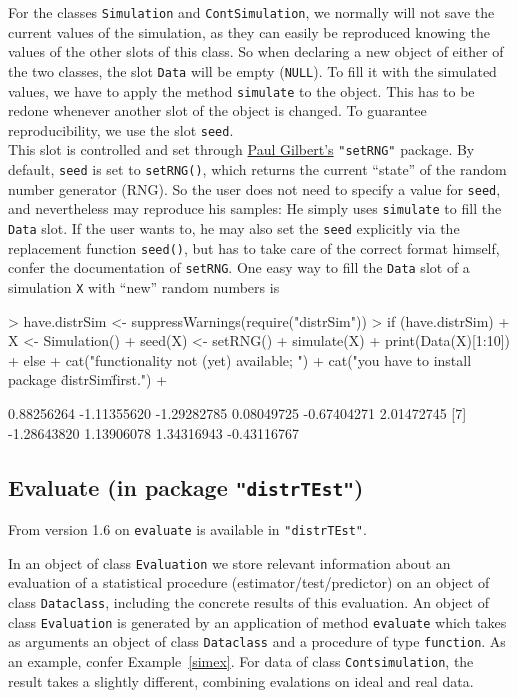 \documentclass[11pt]{article}
\newcommand{\code}[1]{{\tt #1}}
\newcommand{\pkg}[1]{{\tt "#1"}}
\begin{document}
For the classes \code{Simulation} and \code{ContSimulation}, we normally will
not save the current values of the simulation, as they can easily be reproduced
knowing the values of the other slots of this class.
%
So when declaring a new object of either of the two classes, the slot 
\code{Data} will be empty (\code{NULL}).
To fill it with the simulated values, we have to apply the method 
\code{simulate} to the object. This has to be redone whenever another slot of 
the object is changed.
%
To guarantee reproducibility, we use the slot \code{seed}.\\
%
This slot is controlled and set through 
\href{mailto:pgilbert@bank-banque-canada.ca}{Paul Gilbert's} \pkg{setRNG} 
package.
By default, \code{seed} is set to \code{setRNG()}, which returns the current 
``state'' of the random number generator (RNG). So the user does not need to 
specify a value for \code{seed}, and nevertheless may reproduce his samples: 
He simply uses \code{simulate} to fill the \code{Data} slot.
If the user wants to, he may also set the \code{seed} explicitly via the 
replacement function \code{seed()}, but has to take care of the correct format 
himself, confer the documentation of \code{setRNG}. One easy way to fill 
the \code{Data} slot of a simulation \code{X} with ``new'' random numbers is
\begin{Schunk}
\begin{Sinput}
> have.distrSim <- suppressWarnings(require("distrSim"))
> if (have.distrSim)
+    {X <- Simulation()
+     seed(X) <- setRNG()
+     simulate(X)
+     print(Data(X)[1:10])
+    } else { 
+     cat("\n functionality not (yet) available; ")
+     cat("you have to install package \"distrSim\" first.\n")
+     }
\end{Sinput}
\begin{Soutput}
 [1]  0.88256264 -1.11355620 -1.29282785  0.08049725 -0.67404271  2.01472745
 [7] -1.28643820  1.13906078  1.34316943 -0.43116767
\end{Soutput}
\end{Schunk}
%
\subsection[Evaluate (in package distrTEst)]%
{Evaluate (in package \pkg{distrTEst})}\label{evaluate}
%
From version 1.6 on \code{evaluate} is available in  \pkg{distrTEst}.

In an object of class \code{Evaluation}  we store relevant information
about an evaluation of a statistical procedure (estimator/test/predictor)
on an object of class \code{Dataclass}, including the concrete results of
this evaluation. An object of class \code{Evaluation}  is generated by an 
application of method \code{evaluate} which takes as arguments an object of 
class  \code{Dataclass} and a procedure of type \code{function}. As an example, 
confer Example~\ref{simex}.
For data of class \code{Contsimulation}, the result takes a slightly different,
combining evalations on ideal and real data.
%
\end{document}
